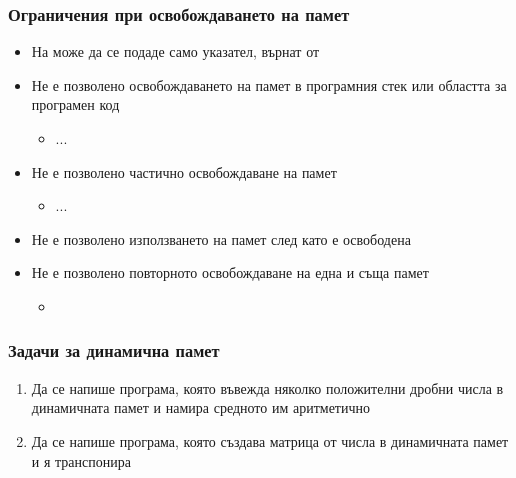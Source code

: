 \documentclass[alsotrans]{beamerswitch}
\begin{document}
\begin{frame}[fragile]
  \frametitle{Ограничения при освобождаването на памет}

  \begin{itemize}[<+->]
  \item На  може да се подаде само указател, върнат от 
  \item Не е позволено освобождаването на памет в програмния стек или областта за програмен код
    \begin{itemize}
    \item {} ... 
    \end{itemize}
  \item Не е позволено частично освобождаване на памет
    \begin{itemize}
    \item {} ... 
    \end{itemize}
  \item Не е позволено използването на памет след като е освободена
  \item Не е позволено повторното освобождаване на една и съща памет
    \begin{itemize}
    \item {} 
    \end{itemize}
  \end{itemize}
\end{frame}

\begin{frame}
  \frametitle{Задачи за динамична памет}

  \begin{enumerate}[<+->]
  \item Да се напише програма, която въвежда няколко положителни дробни числа в динамичната памет и намира средното им аритметично
  \item Да се напише програма, която създава матрица от числа в динамичната памет и я транспонира
  \end{enumerate}
\end{frame}
\end{document}
